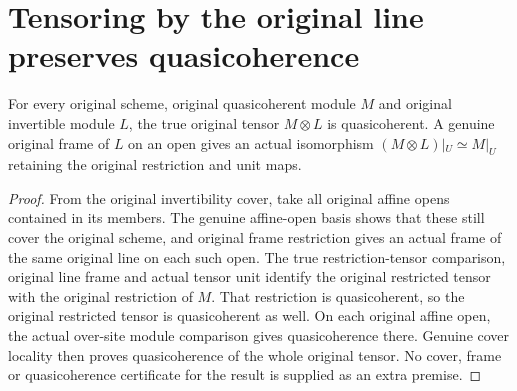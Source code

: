 \section{Tensoring by the original line preserves quasicoherence}

\begin{lemma}
\label{lem:scheme-original-invertible-tensor-quasicoherent}
\leanok
For every original scheme, original quasicoherent module $M$ and original
invertible module $L$, the true original tensor $M\otimes L$ is quasicoherent.
A genuine original frame of $L$ on an open gives an actual isomorphism
$(M\otimes L)|_U\simeq M|_U$ retaining the original restriction and unit maps.
\end{lemma}
\begin{proof}
From the original invertibility cover, take all original affine opens
contained in its members. The genuine affine-open basis shows that these
still cover the original scheme, and original frame restriction gives an
actual frame of the same original line on each such open. The true
restriction-tensor comparison, original line frame and actual tensor unit
identify the original restricted tensor with the original restriction of
$M$. That restriction is quasicoherent, so the original restricted tensor
is quasicoherent as well. On each original affine open, the actual over-site
module comparison gives quasicoherence there. Genuine cover locality then
proves quasicoherence of the whole original tensor. No cover, frame or
quasicoherence certificate for the result is supplied as an extra premise.
\end{proof}
